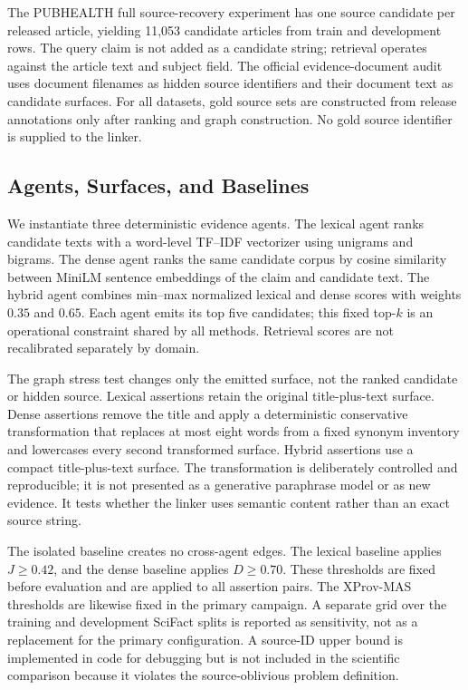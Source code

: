 \documentclass{ieeeaccess}
\begin{document}
The PUBHEALTH full source-recovery experiment has one source candidate per released article, yielding 11,053 candidate articles from train and development rows. The query claim is not added as a candidate string; retrieval operates against the article text and subject field. The official evidence-document audit uses document filenames as hidden source identifiers and their document text as candidate surfaces. For all datasets, gold source sets are constructed from release annotations only after ranking and graph construction. No gold source identifier is supplied to the linker.

\subsection{Agents, Surfaces, and Baselines}
We instantiate three deterministic evidence agents. The lexical agent ranks candidate texts with a word-level TF--IDF vectorizer using unigrams and bigrams. The dense agent ranks the same candidate corpus by cosine similarity between MiniLM sentence embeddings of the claim and candidate text. The hybrid agent combines min--max normalized lexical and dense scores with weights $0.35$ and $0.65$. Each agent emits its top five candidates; this fixed top-$k$ is an operational constraint shared by all methods. Retrieval scores are not recalibrated separately by domain.

The graph stress test changes only the emitted surface, not the ranked candidate or hidden source. Lexical assertions retain the original title-plus-text surface. Dense assertions remove the title and apply a deterministic conservative transformation that replaces at most eight words from a fixed synonym inventory and lowercases every second transformed surface. Hybrid assertions use a compact title-plus-text surface. The transformation is deliberately controlled and reproducible; it is not presented as a generative paraphrase model or as new evidence. It tests whether the linker uses semantic content rather than an exact source string.

The isolated baseline creates no cross-agent edges. The lexical baseline applies $J\geq0.42$, and the dense baseline applies $D\geq0.70$. These thresholds are fixed before evaluation and are applied to all assertion pairs. The XProv-MAS thresholds are likewise fixed in the primary campaign. A separate grid over the training and development SciFact splits is reported as sensitivity, not as a replacement for the primary configuration. A source-ID upper bound is implemented in code for debugging but is not included in the scientific comparison because it violates the source-oblivious problem definition.
\end{document}

